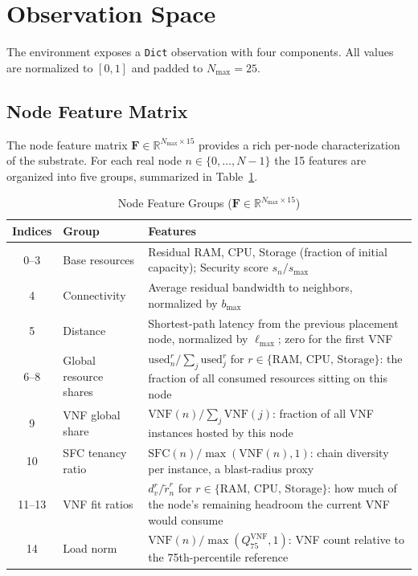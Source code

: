 \section{Observation Space}

The environment exposes a \texttt{Dict} observation with four components. All values are normalized to $[0, 1]$ and padded to $N_{\max} = 25$.

\subsection{Node Feature Matrix}

The node feature matrix $\mathbf{F} \in \mathbb{R}^{N_{\max} \times 15}$ provides a rich per-node characterization of the substrate. For each real node $n \in \{0, \ldots, N-1\}$ the 15 features are organized into five groups, summarized in Table~\ref{tab:node_features}.

\begin{table}[!ht]
\centering
\caption{Node Feature Groups ($\mathbf{F} \in \mathbb{R}^{N_{\max} \times 15}$)}
\label{tab:node_features}
\begin{tabularx}{\textwidth}{c l X}
\hline
\textbf{Indices} & \textbf{Group} & \textbf{Features} \\ \hline
0--3  & Base resources      & Residual RAM, CPU, Storage (fraction of initial capacity); Security score $s_n / s_{\max}$ \\
4     & Connectivity        & Average residual bandwidth to neighbors, normalized by $b_{\max}$ \\
5     & Distance            & Shortest-path latency from the previous placement node, normalized by $\ell_{\max}$; zero for the first VNF \\
6--8  & Global resource shares & $\text{used}_n^{r} / \sum_j \text{used}_j^{r}$ for $r \in \{\text{RAM, CPU, Storage}\}$: the fraction of all consumed resources sitting on this node \\
9     & VNF global share    & $\text{VNF}(n) / \sum_j \text{VNF}(j)$: fraction of all VNF instances hosted by this node \\
10    & SFC tenancy ratio   & $\text{SFC}(n) / \max(\text{VNF}(n), 1)$: chain diversity per instance, a blast-radius proxy \\
11--13 & VNF fit ratios     & $d_v^{r} / \tilde{r}_n^{r}$ for $r \in \{\text{RAM, CPU, Storage}\}$: how much of the node's remaining headroom the current VNF would consume \\
14    & Load norm           & $\text{VNF}(n) / \max(Q_{75}^{\text{VNF}}, 1)$: VNF count relative to the 75th-percentile reference \\
\hline
\end{tabularx}
\end{table}

